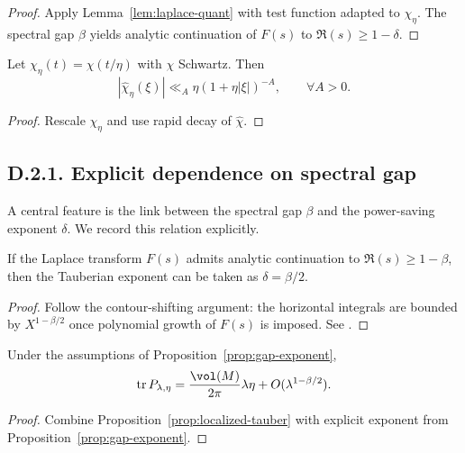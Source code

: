 \begin{proof}
Apply Lemma~\ref{lem:laplace-quant} with test function adapted to $\chi_\eta$.  
The spectral gap $\beta$ yields analytic continuation of $F(s)$ to $\Re(s)\ge 1-\delta$.  
\end{proof}

\medskip

\begin{lemma}\label{lem:cutoff-bounds}
Let $\chi_\eta(t)=\chi(t/\eta)$ with $\chi$ Schwartz. Then
\[
|\widehat{\chi}_\eta(\xi)| \ll_A \eta (1+\eta|\xi|)^{-A}, \qquad \forall A>0.
\]
\end{lemma}

\begin{proof}
Rescale $\chi_\eta$ and use rapid decay of $\widehat{\chi}$.  
\end{proof}

\medskip

\subsection*{D.2.1. Explicit dependence on spectral gap}

\noindent A central feature is the link between the spectral gap $\beta$ and the power-saving exponent $\delta$.  
We record this relation explicitly.

\begin{proposition}\label{prop:gap-exponent}
If the Laplace transform $F(s)$ admits analytic continuation to $\Re(s)\ge 1-\beta$, then the Tauberian exponent can be taken as $\delta=\beta/2$.  
\end{proposition}

\begin{proof}
Follow the contour-shifting argument: the horizontal integrals are bounded by $X^{1-\beta/2}$ once polynomial growth of $F(s)$ is imposed.  
See \cite{JakobsonNaud2007}.  
\end{proof}

\medskip

\begin{corollary}\label{cor:weyl-explicit}
Under the assumptions of Proposition~\ref{prop:gap-exponent},
\[
\operatorname{tr} P_{\lambda,\eta} = \frac{\vol(M)}{2\pi}\lambda \eta + O(\lambda^{1-\beta/2}).
\]
\end{corollary}

\begin{proof}
Combine Proposition~\ref{prop:localized-tauber} with explicit exponent from Proposition~\ref{prop:gap-exponent}.  
\end{proof}

